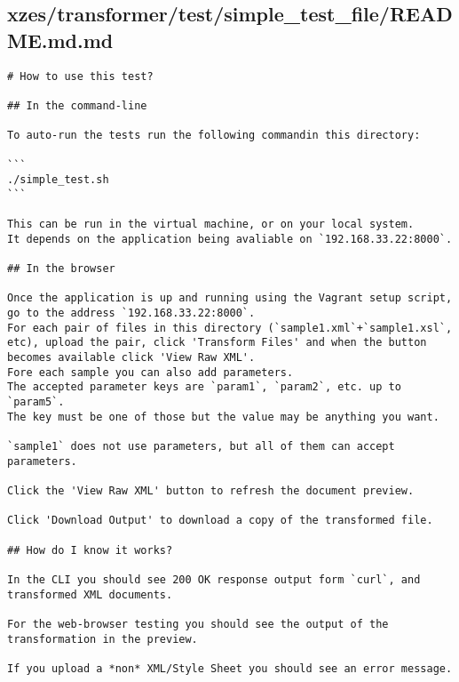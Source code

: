 \subsection{xzes/transformer/test/simple\_test\_file/README.md.md}
\begin{lstlisting}[caption={Usage information for the simple test / smoke test.}]
# How to use this test?

## In the command-line

To auto-run the tests run the following commandin this directory:

```
./simple_test.sh
```

This can be run in the virtual machine, or on your local system.
It depends on the application being avaliable on `192.168.33.22:8000`.

## In the browser

Once the application is up and running using the Vagrant setup script, go to the address `192.168.33.22:8000`.
For each pair of files in this directory (`sample1.xml`+`sample1.xsl`, etc), upload the pair, click 'Transform Files' and when the button becomes available click 'View Raw XML'.
Fore each sample you can also add parameters.
The accepted parameter keys are `param1`, `param2`, etc. up to `param5`.
The key must be one of those but the value may be anything you want.

`sample1` does not use parameters, but all of them can accept parameters.

Click the 'View Raw XML' button to refresh the document preview.

Click 'Download Output' to download a copy of the transformed file.

## How do I know it works?

In the CLI you should see 200 OK response output form `curl`, and transformed XML documents.

For the web-browser testing you should see the output of the transformation in the preview.

If you upload a *non* XML/Style Sheet you should see an error message.
\end{lstlisting}
